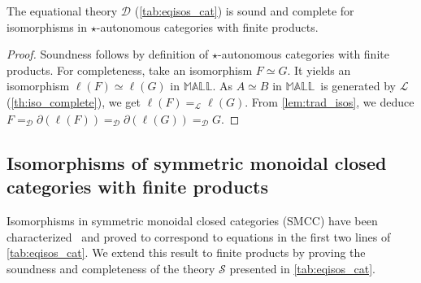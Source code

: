 \documentclass{lmcs}
\newcommand*{\iso}{\mathrel{\simeq}} %
\newcommand*{\Eu}{\mathcal{L}} %
\newcommand*{\eqeq}{=} %
\newcommand*{\eqEu}[1][]{\eqeq_{\Eu_{#1}}} %
\newcommand*{\isom}{\eqEu} %
\newcommand*{\thD}{\mathcal{D}}
\newcommand*{\isoc}{\eqeq_\thD} %
\newcommand*{\thS}{\mathcal{S}}
\newcommand*{\MALL}{\ensuremath{\mathbb{MALL}}}
\newcommand*{\tradm}[1]{\ell(#1)}
\newcommand*{\tradc}[1]{\partial(#1)}
\begin{document}
\begin{thm}
The equational theory $\thD$ (\autoref{tab:eqisos_cat}) is sound and complete for isomorphisms in $\star$-autonomous categories with finite products.
\end{thm}
\begin{proof}
Soundness follows by definition of $\star$-autonomous categories with finite products.
For completeness, take an isomorphism $F\iso G$.
It yields an isomorphism $\tradm{F}\iso\tradm{G}$ in \MALL.
As $A\iso B$ in \MALL\ is generated by $\Eu$ (\autoref{th:iso_complete}), we get $\tradm{F}\isom\tradm{G}$.
From \autoref{lem:trad_isos}, we deduce $F\isoc\tradc{\tradm{F}}\isoc\tradc{\tradm{G}}\isoc G$.
\end{proof}


\subsection{Isomorphisms of symmetric monoidal closed categories with finite products}
\label{subsec:smcc_isos}

Isomorphisms in symmetric monoidal closed categories (SMCC) have been characterized~\cite{isossmcc} and proved to correspond to equations in the first two lines of \autoref{tab:eqisos_cat}.
We extend this result to finite products by proving the soundness and completeness of the theory $\thS$ presented in \autoref{tab:eqisos_cat}.
\end{document}
